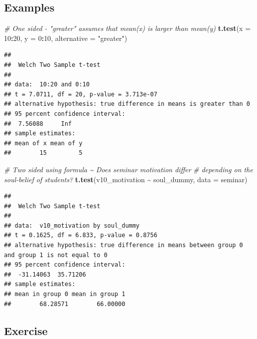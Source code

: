 \documentclass[
]{book}
\newenvironment{Shaded}{\begin{snugshade}}{\end{snugshade}}
\newcommand{\AttributeTok}[1]{\textcolor[rgb]{0.13,0.29,0.53}{#1}}
\newcommand{\CommentTok}[1]{\textcolor[rgb]{0.56,0.35,0.01}{\textit{#1}}}
\newcommand{\DecValTok}[1]{\textcolor[rgb]{0.00,0.00,0.81}{#1}}
\newcommand{\FunctionTok}[1]{\textcolor[rgb]{0.13,0.29,0.53}{\textbf{#1}}}
\newcommand{\NormalTok}[1]{#1}
\newcommand{\SpecialCharTok}[1]{\textcolor[rgb]{0.81,0.36,0.00}{\textbf{#1}}}
\newcommand{\StringTok}[1]{\textcolor[rgb]{0.31,0.60,0.02}{#1}}
\begin{document}
\subsection{Examples}\label{examples}

\begin{Shaded}
\begin{Highlighting}[]
\CommentTok{\# One sided {-} "greater" assumes that mean(x) is larger than mean(y)}
\FunctionTok{t.test}\NormalTok{(}\AttributeTok{x =} \DecValTok{10}\SpecialCharTok{:}\DecValTok{20}\NormalTok{, }\AttributeTok{y =} \DecValTok{0}\SpecialCharTok{:}\DecValTok{10}\NormalTok{, }\AttributeTok{alternative =} \StringTok{"greater"}\NormalTok{)}
\end{Highlighting}
\end{Shaded}

\begin{verbatim}
## 
##  Welch Two Sample t-test
## 
## data:  10:20 and 0:10
## t = 7.0711, df = 20, p-value = 3.713e-07
## alternative hypothesis: true difference in means is greater than 0
## 95 percent confidence interval:
##  7.56088     Inf
## sample estimates:
## mean of x mean of y 
##        15         5
\end{verbatim}

\begin{Shaded}
\begin{Highlighting}[]
\CommentTok{\# Two sided using formula \textasciitilde{} Does seminar motivation differ}
\CommentTok{\# depending on the soul{-}belief of students?}
\FunctionTok{t.test}\NormalTok{(v10\_motivation }\SpecialCharTok{\textasciitilde{}}\NormalTok{ soul\_dummy, }\AttributeTok{data =}\NormalTok{ seminar)}
\end{Highlighting}
\end{Shaded}

\begin{verbatim}
## 
##  Welch Two Sample t-test
## 
## data:  v10_motivation by soul_dummy
## t = 0.1625, df = 6.833, p-value = 0.8756
## alternative hypothesis: true difference in means between group 0 and group 1 is not equal to 0
## 95 percent confidence interval:
##  -31.14063  35.71206
## sample estimates:
## mean in group 0 mean in group 1 
##        68.28571        66.00000
\end{verbatim}

\subsection{\texorpdfstring{Exercise }{Exercise }}\label{exercise-7}
\end{document}
